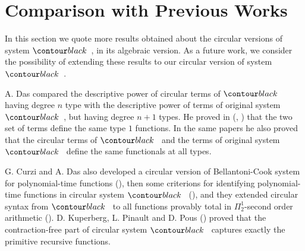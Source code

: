 \section{Comparison with Previous Works}

In this section we quote more results obtained about the circular versions of system $\systemT$,
in its algebraic version. As a future work, we consider the possibility of extending these results
to our circular version of system $\systemT$.

A. Das compared the descriptive power of circular terms of $\systemT$ 
having degree $n$ type with the descriptive power of terms of original system $\systemT$,
but having degree $n+1$ types. 
He  proved in (\cite{2021-Anupam-Das}, \cite{DBLP:conf/fscd/000221})
that the two set of terms define the same type $1$ functions. In the same papers he also proved 
that the circular terms of $\systemT$ and the terms of original system $\systemT$ 
define the same functionals at all types.

G. Curzi and A. Das  also developed a circular version of Bellantoni-Cook system for 
polynomial-time functions (\cite{DBLP:conf/lics/Curzi022}), 
then some criterions for identifying polynomial-time functions
in circular system $\systemT$ (\cite{DBLP:conf/csl/Curzi023}),
and they extended circular syntax from $\systemT$ to all functions provably total in 
$\Pi^1_2$-second order arithmetic (\cite{DBLP:conf/lics/Curzi023}).
D. Kuperberg, L. Pinault and D. Pous (\cite{2021-Kuperberg-Pinault-Pous})
proved that the contraction-free part of circular system $\systemT$
captures exactly the primitive recursive functions.